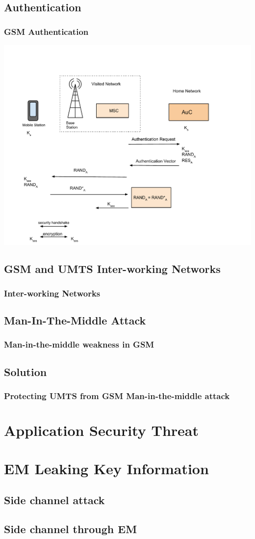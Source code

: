 \documentclass{beamer}
\begin{document}
\subsection{Authentication}
\begin{frame}
  \frametitle{GSM Authentication}
  \begin{center}
  \includegraphics[scale =.32]{GSMAuthentication.pdf}

  \end{center} 
\end{frame}

\subsection{GSM and UMTS Inter-working Networks}
\begin{frame}
	\frametitle{Inter-working Networks}
\end{frame}
\subsection{Man-In-The-Middle Attack}
\begin{frame}
	\frametitle{Man-in-the-middle weakness in GSM}
\end{frame}
\subsection{Solution}
\begin{frame}
\frametitle{Protecting UMTS from GSM Man-in-the-middle attack}
\end{frame}
\section{Application Security Threat}
\section{EM Leaking Key Information}
	\subsection{Side channel attack}
	\subsection{Side channel through EM }
\end{document}
